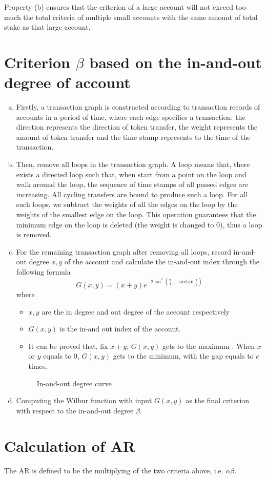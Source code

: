 \documentclass[12pt]{article}
\begin{document}
Property (b) ensures that the criterion of a large account will not exceed too much the total criteria of multiple small accounts with the same amount of total stake as that large account,
\section*{Criterion $\beta$ based on the in-and-out degree of account}
\begin{enumerate}[(a)]
	\item Firstly, a transaction graph is constructed according to transaction records of accounts in a  period of time, where each edge specifies a transaction: the direction represents the direction of token transfer, the weight represents the amount of token transfer and the time stamp represents to the time of the transaction.
	\item Then, remove all loops in the transaction graph. A loop means that, there exists a directed loop such that, when start from a point on the loop and walk around the loop, the sequence of time stamps of all passed edges are increasing. All cycling transfers are bound to produce such a loop. For all such loops, we subtract the weights of all the edges on the loop by the weights of the smallest edge on the  loop. This operation guarantees that the minimum edge on the loop is deleted (the weight is changed to 0), thus a loop is removed.
	\item For the remaining transaction graph after removing all loops, record in-and-out degree $x,y$ of the account and calculate the in-and-out index through the following formula
	$$G(x,y) = (x+y)e^{-2\sin^2(\frac{\pi}{4}-\arctan \frac{x}{y}) }$$
	where
	\begin{itemize}
		\item $x,y$ are the in degree and out degree of the account respectively

		\item $G(x,y)$ is the in-and out index of the account.
		\item It can be proved that, fix $x+y$,  $G(x,y)$ gets to the maximum . When $x$ or $y$ equals to 0, $G(x,y)$ gets to the minimum, with the gap equals to $e$ times.
	\end{itemize}
\begin{figure}
	\centering
	
	\caption{In-and-out degree curve \label{fig-surf}}
\end{figure}

	\item Computing the Wilbur function with input $G(x,y)$ as the final criterion with respect to the in-and-out degree $\beta$.
\end{enumerate}

\section*{Calculation of AR}
The AR is defined to be the multiplying of the two criteria above, i.e. $\alpha\beta$.
\end{document}
